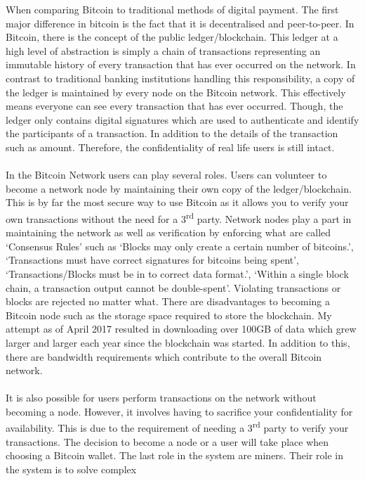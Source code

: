 \documentclass[10pt, a4paper]{report}
\begin{document}
When comparing Bitcoin to traditional methods of digital payment.
The first major difference in bitcoin is the fact that it is decentralised and peer-to-peer.
In Bitcoin, there is the concept of the public ledger/blockchain.
This ledger at a high level of abstraction is simply a chain of transactions representing
an immutable history of every transaction that has ever occurred on the network.
In contrast to traditional banking institutions handling this responsibility,
a copy of the ledger is maintained by every node on the Bitcoin network. This effectively
means everyone can see every transaction that has ever occurred. Though,
the ledger only contains digital signatures which are used to authenticate and identify the participants of a transaction.
In addition to the details of the transaction such as amount.
Therefore, the confidentiality of real life users is still intact.
\\\\
In the Bitcoin Network users can play several roles. Users can volunteer to become a
network node by maintaining their own copy of the ledger/blockchain. This is by far the
most secure way to use Bitcoin as it allows you to verify your own transactions
without the need for a 3\textsuperscript{rd} party. Network nodes play a part in maintaining the network as well as verification
by enforcing what are called `Consensus Rules' such as `Blocks may only create a certain number
of bitcoins.', `Transactions must have correct signatures for bitcoins being spent',
`Transactions/Blocks must be in to correct data format.',
`Within a single block chain, a transaction output cannot be double-spent'.
Violating transactions or blocks are rejected no matter what.
There are disadvantages to becoming a Bitcoin node such as the storage space required
to store the blockchain. My attempt as of April 2017 resulted in downloading over
100GB of data which grew larger and larger each year since the blockchain was started.
In addition to this, there are bandwidth requirements which contribute to the
overall Bitcoin network.
\\\\
It is also possible for users perform transactions on the network without becoming a node.
However, it involves having to sacrifice your confidentiality for availability. This
is due to the requirement of needing a 3\textsuperscript{rd} party to verify your transactions.
The decision to become a node or a user will take place when choosing a Bitcoin wallet.
The last role in the system are miners. Their role in the system is to solve complex
\end{document}
